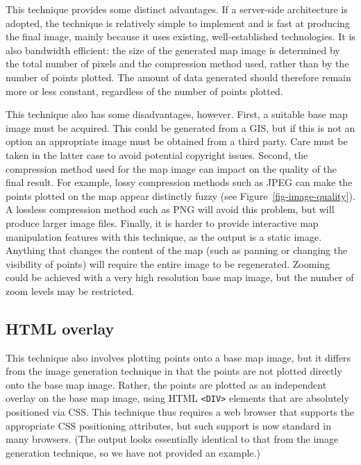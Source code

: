 \documentclass[acmtocl,acmnow]{acmtrans2m}
\begin{document}
This technique provides some distinct advantages. If a server-side
architecture is adopted, the technique is relatively simple to implement
and is fast at producing the final image, mainly because it uses
existing, well-established technologies. It is also bandwidth efficient:
the size of the generated map image is determined by the total number of
pixels and the compression method used, rather than by the number of
points plotted. The amount of data generated should therefore remain
more or less constant, regardless of the number of points plotted.

This technique also has some disadvantages, however. First, a suitable
base map image must be acquired. This could be generated from a GIS, but
if this is not an option an appropriate image must be obtained from a
third party. Care must be taken in the latter case to avoid potential
copyright issues. Second, the compression method used for the map image
can impact on the quality of the final result. For example, lossy
compression methods such as JPEG can make the points plotted on the map
appear distinctly fuzzy (see Figure~\ref{fig-image-quality}). A
lossless compression method such as PNG will avoid this problem, but
will produce larger image files. Finally, it is harder to provide
interactive map manipulation features with this technique, as the output
is a static image. Anything that changes the content of the map (such as
panning or changing the visibility of points) will require the entire
image to be regenerated. Zooming could be achieved with a very high
resolution base map image, but the number of zoom levels may be
restricted.


\subsection{HTML overlay}
\label{sec-overlay}


This technique also involves plotting points onto a base map image, but
it differs from the image generation technique in that the points are
not plotted directly onto the base map image. Rather, the points are
plotted as an independent overlay on the base map image, using HTML
\verb|<DIV>| elements that are absolutely positioned via CSS. This
technique thus requires a web browser that supports the appropriate CSS
positioning attributes, but such support is now standard in many
browsers. (The output looks essentially identical to that from the image
generation technique, so we have not provided an example.)
\end{document}
